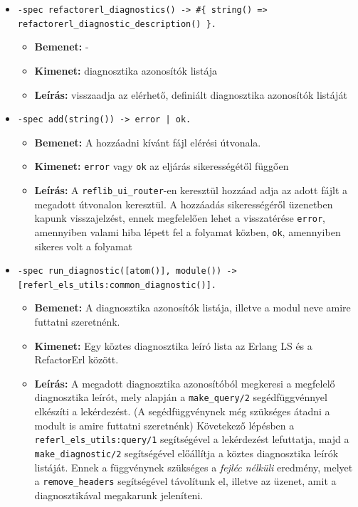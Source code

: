 \begin{itemize}
    \item \lstinline|-spec refactorerl_diagnostics() -> #{ string() => refactorerl_diagnostic_description() }.|
    \begin{itemize}
        \item \textbf{Bemenet:} -
        \item \textbf{Kimenet:} diagnosztika azonosítók listája
        \item \textbf{Leírás:} visszaadja az elérhető, definiált diagnosztika azonosítók listáját
    \end{itemize}
    
    
    
    \item \lstinline{-spec add(string()) -> error | ok.}
    \begin{itemize}
        \item \textbf{Bemenet:} A hozzáadni kívánt fájl elérési útvonala.
        \item \textbf{Kimenet:} \lstinline{error} vagy \lstinline{ok} az eljárás sikerességétől függően
        \item \textbf{Leírás:} A \lstinline{reflib_ui_router}-en keresztül hozzáad adja az adott fájlt a megadott útvonalon keresztül. A hozzáadás sikerességéről üzenetben kapunk visszajelzést, ennek megfelelően lehet a visszatérése \lstinline{error}, amennyiben valami hiba lépett fel a folyamat közben, \lstinline{ok}, amennyiben sikeres volt a folyamat
    \end{itemize}
    
    
    
    \item \lstinline{-spec run_diagnostic([atom()], module()) -> [referl_els_utils:common_diagnostic()].}
    \begin{itemize}
        \item \textbf{Bemenet:} A diagnosztika azonosítók listája, illetve a modul neve amire futtatni szeretnénk.
        \item \textbf{Kimenet:} Egy köztes diagnosztika leíró lista az Erlang LS és a RefactorErl között.
        \item \textbf{Leírás:} A megadott diagnosztika azonosítóból megkeresi a megfelelő diagnosztika leírót, mely alapján a \lstinline{make_query/2} segédfüggvénnyel elkészíti a lekérdezést. (A segédfüggvénynek még szükséges átadni a modult is amire futtatni szeretnénk) Követekező lépésben a \lstinline{referl_els_utils:query/1} segítségével a lekérdezést lefuttatja, majd a \lstinline{make_diagnostic/2} segítségével előállítja a köztes diagnosztika leírók listáját. Ennek a függvénynek szükséges a \textit{fejléc nélküli} eredmény, melyet a \lstinline{remove_headers} segítségével távolítunk el, illetve az üzenet, amit a diagnosztikával megakarunk jeleníteni.
    \end{itemize}
    

\end{itemize}
